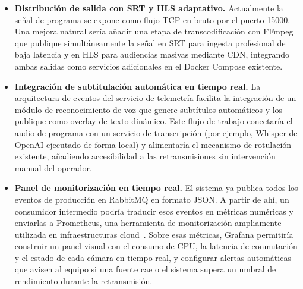 \begin{itemize}
  \item \textbf{Distribución de salida con SRT y HLS adaptativo.}
  Actualmente la señal de programa se expone como flujo TCP en bruto por el puerto
  15000. Una mejora natural sería añadir una etapa de transcodificación con FFmpeg que
  publique simultáneamente la señal en SRT para ingesta profesional de baja latencia
  y en HLS para audiencias masivas mediante CDN, integrando ambas salidas como
  servicios adicionales en el Docker Compose existente.

  \item \textbf{Integración de subtitulación automática en tiempo real.}
  La arquitectura de eventos del servicio de telemetría facilita la integración de
  un módulo de reconocimiento de voz que genere subtítulos automáticos y los publique
  como overlay de texto dinámico. Este flujo de trabajo conectaría el audio de programa
  con un servicio de transcripción (por ejemplo, Whisper de OpenAI ejecutado de forma
  local) y alimentaría el mecanismo de rotulación existente, añadiendo accesibilidad
  a las retransmisiones sin intervención manual del operador.

  \item \textbf{Panel de monitorización en tiempo real.}
  El sistema ya publica todos los eventos de producción en RabbitMQ en formato JSON.
  A partir de ahí, un consumidor intermedio podría traducir esos eventos en métricas
  numéricas y enviarlas a Prometheus, una herramienta de monitorización ampliamente
  utilizada en infraestructuras cloud~\cite{prometheus_docs}. Sobre esas métricas,
  Grafana permitiría construir un panel visual con el consumo de CPU, la latencia de
  conmutación y el estado de cada cámara en tiempo real, y configurar alertas
  automáticas que avisen al equipo si una fuente cae o el sistema supera un umbral
  de rendimiento durante la retransmisión.

\end{itemize}
